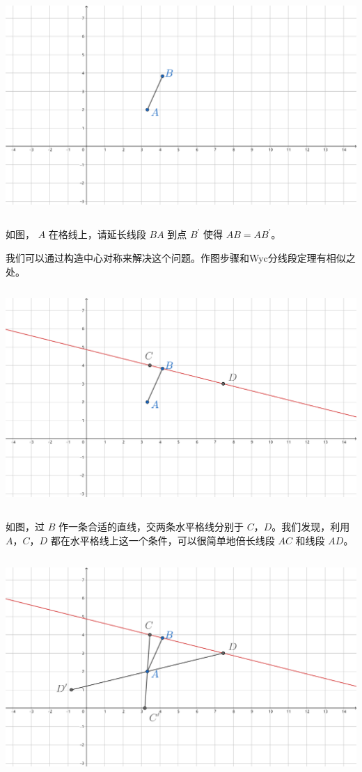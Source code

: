 \documentclass[UTF8]{article}
\begin{document}
\includegraphics[width=5.76806in,height=3.27847in]{media/image30.png}

如图， \(A\) 在格线上，请延长线段 \(BA\) 到点 \(B^{'}\) 使得
\(AB = AB^{'}\)。

我们可以通过构造中心对称来解决这个问题。作图步骤和Wyc分线段定理有相似之处。

\includegraphics[width=5.76806in,height=3.27847in]{media/image31.png}

如图，过 \(B\) 作一条合适的直线，交两条水平格线分别于
\(C\)，\(D\)。我们发现，利用 \(A\)，\(C\)，\(D\)
都在水平格线上这一个条件，可以很简单地倍长线段 \(AC\) 和线段 \(AD\)。

\includegraphics[width=5.76806in,height=3.27847in]{media/image32.png}
\end{document}
